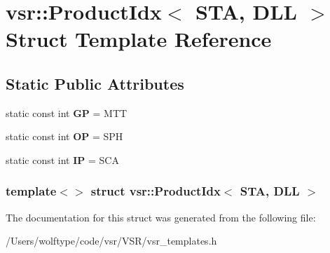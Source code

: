 \hypertarget{structvsr_1_1_product_idx_3_01_s_t_a_00_01_d_l_l_01_4}{\section{vsr\-:\-:Product\-Idx$<$ S\-T\-A, D\-L\-L $>$ Struct Template Reference}
\label{structvsr_1_1_product_idx_3_01_s_t_a_00_01_d_l_l_01_4}
}
\subsection*{Static Public Attributes}
\begin{DoxyCompactItemize}
\item 
\hypertarget{structvsr_1_1_product_idx_3_01_s_t_a_00_01_d_l_l_01_4_a97f81d1aeb0d3de09111364f06f5bc9c}{static const int {\bfseries G\-P} = M\-T\-T}\label{structvsr_1_1_product_idx_3_01_s_t_a_00_01_d_l_l_01_4_a97f81d1aeb0d3de09111364f06f5bc9c}

\item 
\hypertarget{structvsr_1_1_product_idx_3_01_s_t_a_00_01_d_l_l_01_4_ac0e002ebd2a42651951ab4e591094002}{static const int {\bfseries O\-P} = S\-P\-H}\label{structvsr_1_1_product_idx_3_01_s_t_a_00_01_d_l_l_01_4_ac0e002ebd2a42651951ab4e591094002}

\item 
\hypertarget{structvsr_1_1_product_idx_3_01_s_t_a_00_01_d_l_l_01_4_abd03d367d4b3b1206b92da95e96b3e23}{static const int {\bfseries I\-P} = S\-C\-A}\label{structvsr_1_1_product_idx_3_01_s_t_a_00_01_d_l_l_01_4_abd03d367d4b3b1206b92da95e96b3e23}

\end{DoxyCompactItemize}
\subsubsection*{template$<$$>$ struct vsr\-::\-Product\-Idx$<$ S\-T\-A, D\-L\-L $>$}



The documentation for this struct was generated from the following file\-:\begin{DoxyCompactItemize}
\item 
/\-Users/wolftype/code/vsr/\-V\-S\-R/vsr\-\_\-templates.\-h\end{DoxyCompactItemize}
